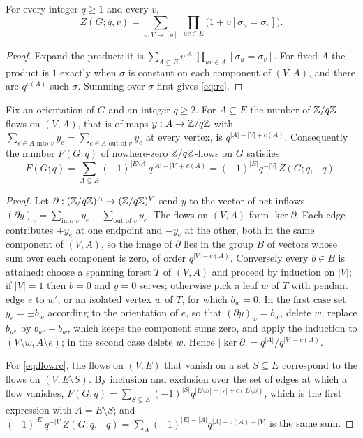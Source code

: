 \begin{lemma}\label{lem:fk}
For every integer $q\ge1$ and every $v$,
\[
  Z(G;q,v)=\sum_{\sigma:V\to[q]}\ \prod_{uv\in E}\bigl(1+v[\sigma_u=\sigma_v]\bigr).
\]
\end{lemma}

\begin{proof}
Expand the product: it is $\sum_{A\subseteq E}v^{|A|}\prod_{uv\in A}[\sigma_u=\sigma_v]$.
For fixed $A$ the product is $1$ exactly when $\sigma$ is constant on each
component of $(V,A)$, and there are $q^{c(A)}$ such $\sigma$. Summing over
$\sigma$ first gives \eqref{eq:rc}.
\end{proof}

\begin{lemma}[Flows]\label{lem:flows}
Fix an orientation of $G$ and an integer $q\ge2$. For $A\subseteq E$ the number
of $\mathbb{Z}/q\mathbb{Z}$-flows on $(V,A)$, that is of maps $y:A\to\mathbb{Z}/q\mathbb{Z}$ with
$\sum_{e\in A\text{ into }v}y_e=\sum_{e\in A\text{ out of }v}y_e$ at every
vertex, is $q^{|A|-|V|+c(A)}$. Consequently the number $F(G;q)$ of nowhere-zero
$\mathbb{Z}/q\mathbb{Z}$-flows on $G$ satisfies
\begin{equation}\label{eq:flowrc}
  F(G;q)=\sum_{A\subseteq E}(-1)^{|E\setminus A|}q^{|A|-|V|+c(A)}
  =(-1)^{|E|}q^{-|V|}\,Z(G;q,-q).
\end{equation}
\end{lemma}

\begin{proof}
Let $\partial:(\mathbb{Z}/q\mathbb{Z})^A\to(\mathbb{Z}/q\mathbb{Z})^V$ send $y$ to the vector of net inflows
$(\partial y)_v=\sum_{\text{into }v}y_e-\sum_{\text{out of }v}y_e$. The flows on
$(V,A)$ form $\ker\partial$. Each edge contributes $+y_e$ at one endpoint and
$-y_e$ at the other, both in the same component of $(V,A)$, so the image of
$\partial$ lies in the group $B$ of vectors whose sum over each component is
zero, of order $q^{|V|-c(A)}$. Conversely every $b\in B$ is attained: choose a
spanning forest $T$ of $(V,A)$ and proceed by induction on $|V|$; if $|V|=1$ then
$b=0$ and $y=0$ serves; otherwise pick a leaf $w$ of $T$ with pendant edge $e$
to $w'$, or an isolated vertex $w$ of $T$, for which $b_w=0$. In the first case
set $y_e=\pm b_w$ according to the orientation of $e$, so that $(\partial y)_w=b_w$,
delete $w$, replace $b_{w'}$ by $b_{w'}+b_w$, which keeps the component sums
zero, and apply the induction to $(V\setminus w,A\setminus e)$; in the second
case delete $w$. Hence $|\ker\partial|=q^{|A|}/q^{|V|-c(A)}$.

For \eqref{eq:flowrc}, the flows on $(V,E)$ that vanish on a set $S\subseteq E$
correspond to the flows on $(V,E\setminus S)$. By inclusion and exclusion over
the set of edges at which a flow vanishes,
$F(G;q)=\sum_{S\subseteq E}(-1)^{|S|}q^{|E\setminus S|-|V|+c(E\setminus S)}$,
which is the first expression with $A=E\setminus S$; and
$(-1)^{|E|}q^{-|V|}Z(G;q,-q)=\sum_A(-1)^{|E|-|A|}q^{|A|+c(A)-|V|}$ is the same
sum.
\end{proof}

